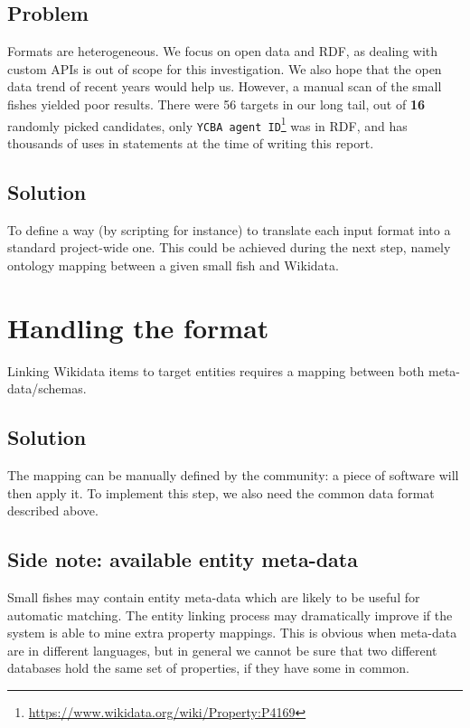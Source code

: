 \subsection{Problem}
\label{cha:221}
Formats are heterogeneous. We focus on open data and RDF, as dealing with custom APIs is out of scope for this investigation. We also hope that the open data trend of recent years would help us. However, a manual scan of the small fishes yielded poor results. There were 56 targets in our long tail, out of \textbf{16} randomly picked candidates, only \texttt{YCBA agent ID}\footnote{\url{https://www.wikidata.org/wiki/Property:P4169}} was in RDF, and has thousands of uses in statements at the time of writing this report.
\subsection{Solution}
\label{cha:222}
To define a way (by scripting for instance) to translate each input format into a standard project-wide one. This could be achieved during the next step, namely ontology mapping between a given small fish and Wikidata.

\section{Handling the format}
\label{cha:23}
Linking Wikidata items to target entities requires a mapping between both meta-data/schemas.

\subsection{Solution}
\label{cha:231}
The mapping can be manually defined by the community: a piece of software will then apply it. To implement this step, we also need the common data format described above.

\subsection{Side note: available entity meta-data}
\label{cha:232}
Small fishes may contain entity meta-data which are likely to be useful for automatic matching. The entity linking process may dramatically improve if the system is able to mine extra property mappings. This is obvious when meta-data are in different languages, but in general we cannot be sure that two different databases hold the same set of properties, if they have some in common.

